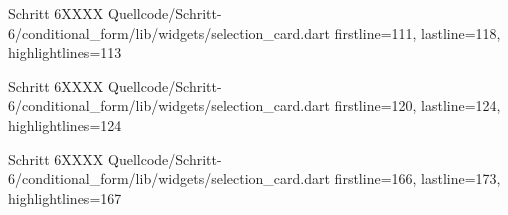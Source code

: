 \begin{alexlisting}{Schritt 6}{XXXX}
    {Quellcode/Schritt-6/conditional_form/lib/widgets/selection_card.dart}
    {firstline=111, lastline=118, highlightlines={113}}
    \label{lst:Schritt6XXXX}
\end{alexlisting}

\begin{alexlisting}{Schritt 6}{XXXX}
    {Quellcode/Schritt-6/conditional_form/lib/widgets/selection_card.dart}
    {firstline=120, lastline=124, highlightlines={124}}
    \label{lst:Schritt6XXXX}
\end{alexlisting}

\begin{alexlisting}{Schritt 6}{XXXX}
    {Quellcode/Schritt-6/conditional_form/lib/widgets/selection_card.dart}
    {firstline=166, lastline=173, highlightlines={167}}
    \label{lst:Schritt6XXXX}
\end{alexlisting}